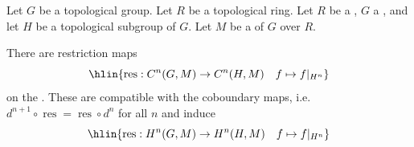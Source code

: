 \begin{definition} \label{definition:restriction_map_of_continuous_group_cohomology_of_a_topological_group_on_a_topological_module}
    Let $G$ be a topological group. Let $R$ be a topological ring. 
    Let $R$ be a , $G$ a , and let $H$ be a topological subgroup of $G$. Let $M$ be a  of $G$ over $R$.

    There are restriction maps
    $$\hlin{\operatorname{res}: C^n(G,M) \to C^n(H,M) \quad f \mapsto f|_{H^n}}$$
    on the . These are compatible with the coboundary maps, i.e. $d^{n+1} \circ \operatorname{res} = \operatorname{res} \circ d^n$ for all $n$ and induce 
    $$\hlin{\operatorname{res}: H^n(G,M) \to H^n(H,M) \quad f \mapsto f|_{H^n}}$$

\end{definition}